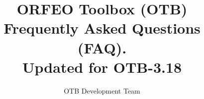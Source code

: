 \documentclass[english]{article}
\begin{document}
\title{ORFEO Toolbox (OTB) Frequently Asked Questions (FAQ).\\ Updated
  for OTB-3.18}


\author{OTB Development Team}


\maketitle

\tableofcontents



%

%
\end{document}
